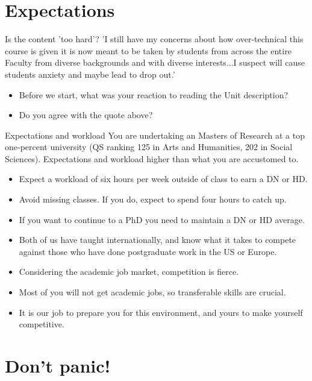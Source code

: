 \documentclass[aspectratio=169, 11pt]{beamer} %
\begin{document}
\section{Expectations}

\begin{frame}{Is the content 'too hard'?}
 'I still have my concerns about how over-technical this course is given it is now meant to be taken by students from across the entire Faculty from diverse backgrounds and with diverse interests...I suspect will cause students anxiety and maybe lead to drop out.'
    \begin{itemize}[label=\textbullet]
        \item Before we start, what was your reaction to reading the Unit description?
        \item Do you agree with the quote above?
    \end{itemize}
\end{frame}

\begin{frame}{Expectations and workload}
  You are undertaking an Masters of Research at a top one-percent university (QS ranking 125 in Arts and Humanities, 202 in Social Sciences). Expectations and workload higher than what you are accustomed to.
    \begin{itemize}[label=\textbullet]
        \item Expect a workload of six hours per week outside of class to earn a DN or HD.
        \item Avoid missing classes. If you do, expect to spend four hours to catch up.
        \item If you want to continue to a PhD you need to maintain a DN or HD average.
        \item Both of us have taught internationally, and know what it takes to compete against those who have done postgraduate work in the US or Europe.
        \item Considering the academic job market, competition is fierce.
        \item Most of you will not get academic jobs, so transferable skills are crucial.
        \item It is our job to prepare you for this environment, and yours to make yourself competitive.
    \end{itemize}
\end{frame}

\section{Don't panic!}
\end{document}
